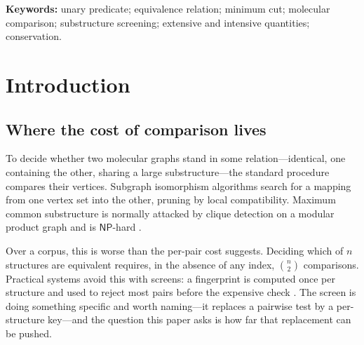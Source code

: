 \documentclass[11pt,twocolumn,a4paper]{article}
\theoremstyle{upthm}
\theoremstyle{definition}
\theoremstyle{remark}
\newcommand{\sep}{\sigma}
\begin{document}
\begin{abstract}
We then measure what the predicate buys. Total $\sep$ is exactly
conserved across all $8$ balanced rearrangements tested, with zero
residual. The $\sep$ profile partitions a $30$-structure corpus into
$22$ classes with a largest class of $3$, and the partition is identical
under $20$ shuffles while a context-reading control differs under all
$12$.

We are explicit about what this does not establish. The predicate is
sound but not complete---structures with equal $\sep$ profiles are not
thereby identical---so it is a screen, not an identity test. The linear
scaling is a counting fact about unary versus pairwise evaluation, not a
measured wall-clock speedup, and each evaluation costs $n$ maximum flows.
The conserved quantity was measured on eight hand-chosen rearrangements.
And the construction does not address maximum common substructure at
all, because that problem asks for a correspondence, which no unary
predicate can supply.
\end{abstract}

\noindent\textbf{Keywords:} unary predicate; equivalence relation;
minimum cut; molecular comparison; substructure screening; extensive and
intensive quantities; conservation.

\tableofcontents

\section{Introduction}
\label{sec:intro}

\subsection{Where the cost of comparison lives}

To decide whether two molecular graphs stand in some relation---identical,
one containing the other, sharing a large substructure---the standard
procedure compares their vertices. Subgraph isomorphism algorithms
\citep{ullmann1976,cordella2004,ehrlich2012} search for a mapping from
one vertex set into the other, pruning by local compatibility. Maximum
common substructure is normally attacked by clique detection on a
modular product graph and is $\mathsf{NP}$-hard
\citep{raymond2002,ehrlich2011,garey1979}.

Over a corpus, this is worse than the per-pair cost suggests. Deciding
which of $n$ structures are equivalent requires, in the absence of any
index, $\binom{n}{2}$ comparisons. Practical systems avoid this with
screens: a fingerprint is computed once per structure and used to reject
most pairs before the expensive check \citep{barnard1993,willett1998,%
sayle2012,swamidass2007}. The screen is doing something specific and
worth naming---it replaces a pairwise test by a per-structure key---and
the question this paper asks is how far that replacement can be pushed.
\end{document}
